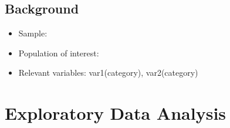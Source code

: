 \documentclass[
]{article}
\providecommand{\tightlist}{%
  \setlength{\itemsep}{0pt}\setlength{\parskip}{0pt}}
\begin{document}
\subsection{Background}\label{background}

\begin{itemize}
\tightlist
\item
  Sample:
\item
  Population of interest:
\item
  Relevant variables: var1(category), var2(category)
\end{itemize}

\section{Exploratory Data Analysis}\label{exploratory-data-analysis}
\end{document}
